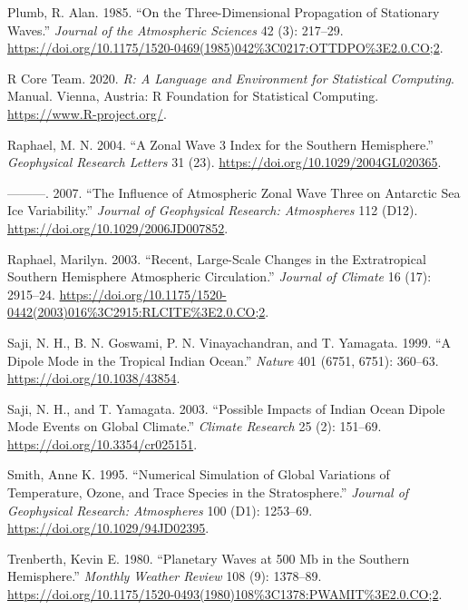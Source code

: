 \documentclass[smallextended]{svjour3}       %
\newlength{\cslhangindent}
\newlength{\cslentryspacingunit} %
\newenvironment{CSLReferences}[2] %
 {%
  \setlength{\parindent}{0pt}
  \ifodd #1
  \let\oldpar\par
  \def\par{\hangindent=\cslhangindent\oldpar}
  \fi
  \setlength{\parskip}{#2\cslentryspacingunit}
 }%
 {}
\begin{document}
\begin{CSLReferences}{1}{0}
\leavevmode{}%
Plumb, R. Alan. 1985. {``On the {Three-Dimensional Propagation} of {Stationary Waves}.''} \emph{Journal of the Atmospheric Sciences} 42 (3): 217--29. \url{https://doi.org/10.1175/1520-0469(1985)042\%3C0217:OTTDPO\%3E2.0.CO;2}.

\leavevmode{}%
R Core Team. 2020. \emph{R: {A} Language and Environment for Statistical Computing}. Manual. {Vienna, Austria}: {R Foundation for Statistical Computing}. \url{https://www.R-project.org/}.

\leavevmode{}%
Raphael, M. N. 2004. {``A Zonal Wave 3 Index for the {Southern Hemisphere}.''} \emph{Geophysical Research Letters} 31 (23). \url{https://doi.org/10.1029/2004GL020365}.

\leavevmode{}%
---------. 2007. {``The Influence of Atmospheric Zonal Wave Three on {Antarctic} Sea Ice Variability.''} \emph{Journal of Geophysical Research: Atmospheres} 112 (D12). \url{https://doi.org/10.1029/2006JD007852}.

\leavevmode{}%
Raphael, Marilyn. 2003. {``Recent, {Large-Scale Changes} in the {Extratropical Southern Hemisphere Atmospheric Circulation}.''} \emph{Journal of Climate} 16 (17): 2915--24. \url{https://doi.org/10.1175/1520-0442(2003)016\%3C2915:RLCITE\%3E2.0.CO;2}.

\leavevmode{}%
Saji, N. H., B. N. Goswami, P. N. Vinayachandran, and T. Yamagata. 1999. {``A Dipole Mode in the Tropical {Indian Ocean}.''} \emph{Nature} 401 (6751, 6751): 360--63. \url{https://doi.org/10.1038/43854}.

\leavevmode{}%
Saji, N. H., and T. Yamagata. 2003. {``Possible Impacts of {Indian Ocean Dipole} Mode Events on Global Climate.''} \emph{Climate Research} 25 (2): 151--69. \url{https://doi.org/10.3354/cr025151}.

\leavevmode{}%
Smith, Anne K. 1995. {``Numerical Simulation of Global Variations of Temperature, Ozone, and Trace Species in the Stratosphere.''} \emph{Journal of Geophysical Research: Atmospheres} 100 (D1): 1253--69. \url{https://doi.org/10.1029/94JD02395}.

\leavevmode{}%
Trenberth, Kevin E. 1980. {``Planetary {Waves} at 500 Mb in the {Southern Hemisphere}.''} \emph{Monthly Weather Review} 108 (9): 1378--89. \url{https://doi.org/10.1175/1520-0493(1980)108\%3C1378:PWAMIT\%3E2.0.CO;2}.


\end{CSLReferences}
\end{document}
